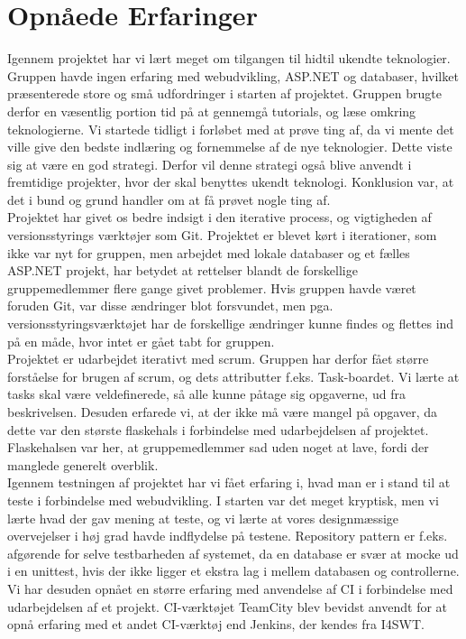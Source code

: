 \chapter{Opnåede Erfaringer}

Igennem projektet har vi lært meget om tilgangen til hidtil ukendte teknologier. Gruppen havde ingen erfaring med webudvikling, ASP.NET og databaser, hvilket præsenterede store og små udfordringer i starten af projektet. Gruppen brugte derfor en væsentlig portion tid på at gennemgå tutorials, og læse omkring teknologierne. Vi startede tidligt i forløbet med at prøve ting af, da vi mente det ville give den bedste indlæring og fornemmelse af de nye teknologier. Dette viste sig at være en god strategi. Derfor vil denne strategi også blive anvendt i fremtidige projekter, hvor der skal benyttes ukendt teknologi. Konklusion var, at det i bund og grund handler om at få prøvet nogle ting af.\\


Projektet har givet os bedre indsigt i den iterative process, og vigtigheden af versionsstyrings værktøjer som Git. Projektet er blevet kørt i iterationer, som ikke var nyt for gruppen, men arbejdet med lokale databaser og et fælles ASP.NET projekt, har betydet at rettelser blandt de forskellige gruppemedlemmer flere gange givet problemer. Hvis gruppen havde været foruden Git, var disse ændringer blot forsvundet, men pga. versionsstyringsværktøjet har de forskellige ændringer kunne findes og flettes ind på en måde, hvor intet er gået tabt for gruppen. \\

Projektet er udarbejdet iterativt med scrum. Gruppen har derfor fået større forståelse for brugen af scrum, og dets attributter f.eks. Task-boardet. Vi lærte at tasks skal være veldefinerede, så alle kunne påtage sig opgaverne, ud fra beskrivelsen. Desuden erfarede vi, at der ikke må være mangel på opgaver, da dette var den største flaskehals i forbindelse med udarbejdelsen af projektet. Flaskehalsen var her, at gruppemedlemmer sad uden noget at lave, fordi der manglede generelt overblik.\\

Igennem testningen af projektet har vi fået erfaring i, hvad man er i stand til at teste i forbindelse med webudvikling. I starten var det meget kryptisk, men vi lærte hvad der gav mening at teste, og vi lærte at vores designmæssige overvejelser i høj grad havde indflydelse på testene. Repository pattern er f.eks. afgørende for selve testbarheden af systemet, da en database er svær at mocke ud i en unittest, hvis der ikke ligger et ekstra lag i mellem databasen og controllerne.\\

Vi har desuden opnået en større erfaring med anvendelse af CI i forbindelse med udarbejdelsen af et projekt. CI-værktøjet TeamCity blev bevidst anvendt for at opnå erfaring med et andet CI-værktøj end Jenkins, der kendes fra I4SWT.


